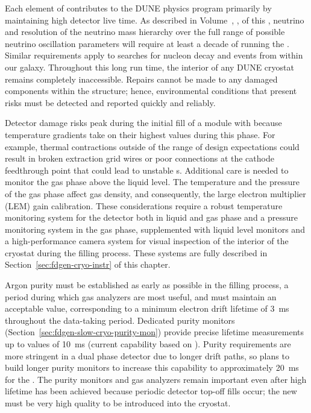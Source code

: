 Each element of  contributes to the DUNE physics program primarily by maintaining high detector live time.  As described in Volume~\volnumberphysics{}, \voltitlephysics{}, of this , neutrino  and resolution of the neutrino mass hierarchy over the full range of possible neutrino oscillation parameters will require at least a decade of running the .  Similar requirements apply to searches for nucleon decay and  events from within our galaxy.  Throughout this long run time, the interior of any DUNE cryostat remains completely inaccessible.  Repairs cannot be made to any damaged components within the  structure; hence, environmental conditions that present risks must be detected and reported quickly and reliably. 
 
Detector damage risks peak during the initial fill of a module with \lar because temperature gradients take on their highest values during this phase.  For example, thermal contractions outside of the range of design expectations could result in broken extraction grid wires or poor connections at the cathode  feedthrough point that could lead to unstable \efield{}s. 
Additional care is needed to monitor the
gas phase above the liquid level. The temperature and the pressure of the gas phase affect gas density, and consequently, the large electron multiplier (LEM) gain calibration. These considerations require a robust temperature monitoring system for the detector both in liquid and gas phase and a pressure monitoring system in the gas phase,  
supplemented with liquid level monitors and a high-performance camera system for visual inspection of the interior of the cryostat during the filling process.  These systems are fully described in Section~\ref{sec:fdgen-cryo-instr} of this chapter.
 
Argon purity must be established as early as possible in the filling process, a period during which gas analyzers are most useful, and must maintain an acceptable value, corresponding to a minimum electron drift lifetime of \SI{3}{ms} %
throughout the data-taking period. Dedicated purity monitors (Section~\ref{sec:fdgen-slow-cryo-purity-mon}) provide precise lifetime measurements up to values of \SI{10}{ms} (current capability based on ). Purity requirements are more stringent in a dual phase detector due to longer drift paths, so  plans to build longer purity monitors to increase this capability to approximately \SI{20}{ms} for the  .
The purity monitors and gas analyzers remain important even after high lifetime has been achieved because periodic detector top-off  fills occur; the new \lar must be very high quality to be introduced into the cryostat.
 
